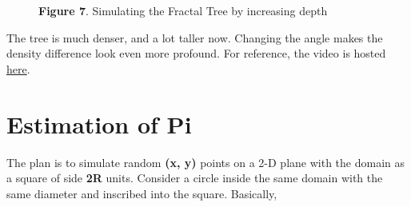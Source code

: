 \documentclass{resonance}
\begin{document}
\begin{figure}[h!]
    \hskip 3.27cm
    
    \vspace{10pt}
    \hspace{90pt}\scriptsize{\textbf{Figure 7}. \normalfont Simulating the Fractal Tree by increasing depth}
\end{figure}

\pagebreak

The tree is much denser, and a lot taller now. Changing the angle makes the density difference look even more profound. For reference, the video is hosted \textcolor{blue}{\href{https://bit.ly/fractals_simulation}{here}}.

\section{Estimation of Pi}

The plan is to simulate random \textbf{(x, y)} points on a 2-D plane with the domain as a square of side \textbf{2R} units. Consider a circle inside the same domain with the same diameter and inscribed into the square. Basically,
\end{document}
